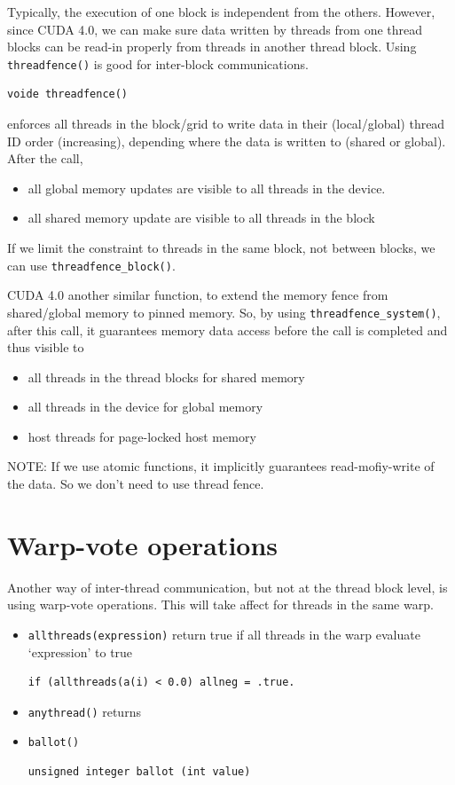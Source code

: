 Typically, the execution of one block is independent from the others. However,
since CUDA 4.0, we can make sure data written by threads from one thread blocks
can be read-in properly from threads in another thread block. Using
\verb!threadfence()! is good for inter-block communications.
\begin{lstlisting}
voide threadfence()
\end{lstlisting}
enforces all threads in the block/grid to write data in their
(local/global) thread ID order (increasing), depending where the data
is written to (shared or global). After the call, 
\begin{itemize}
\item all global memory updates are visible to all threads in the
  device. 
\item all shared memory update are visible to all threads in the block
\end{itemize}
If we limit the constraint to threads in the same block, not between blocks, we
can use \verb!threadfence_block()!.

CUDA 4.0 another similar function, to extend the memory fence from shared/global
memory to pinned memory. So, by using \verb!threadfence_system()!, after this
call, it guarantees memory data access before the call is completed and thus
visible to
\begin{itemize}
\item all threads in the thread blocks for shared memory
\item all threads in the device for global memory
\item host threads for page-locked host memory
\end{itemize}

\begin{framed}
NOTE: If we use atomic functions, it implicitly guarantees read-mofiy-write of
the data. So we don't need to use thread fence. 
\end{framed}

\section{Warp-vote operations}
\label{sec:warp-vote-operations}


Another way of inter-thread communication, but not at the thread block
level, is using warp-vote operations. This will take affect for
threads in the same warp. 
\begin{itemize}
\item \verb!allthreads(expression)! return true if all threads in the
  warp evaluate `expression' to true
\begin{lstlisting}
if (allthreads(a(i) < 0.0) allneg = .true.
\end{lstlisting}


\item \verb!anythread()! returns
\item \verb!ballot()! 
\begin{lstlisting}
unsigned integer ballot (int value)
\end{lstlisting}
\end{itemize}


